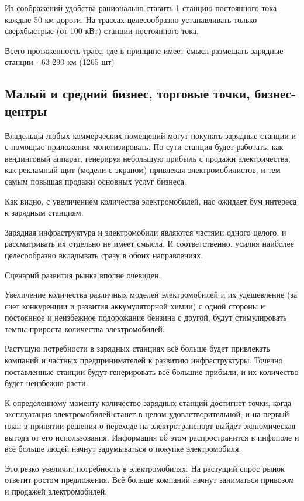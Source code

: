 \documentclass[a4paper,12pt]{report}
\begin{document}
Из соображений удобства рационально ставить 1 станцию постоянного тока каждые 50 км дороги. На трассах целесообразно устанавливать только сверхбыстрые (от 100 кВт) станции постоянного тока. 

Всего протяженность трасс, где в принципе имеет смысл размещать зарядные станции  - 63 290 км (1265 шт)

\subsection{Малый и средний бизнес, торговые точки, бизнес-центры}

Владельцы любых коммерческих помещений могут покупать зарядные станции и с помощью приложения монетизировать. По сути станция будет работать, как вендинговый аппарат, генерируя небольшую прибыль с продажи электричества, как рекламный щит (модели с экраном) привлекая электромобилистов, и тем самым повышая продажи основных услуг бизнеса. 

Как видно, с увеличением количества электромобилей, нас ожидает бум интереса к зарядным станциям. 

Зарядная инфраструктура и электромобили являются частями одного целого, и рассматривать их отдельно не имеет смысла. И соответственно, усилия наиболее целесообразно вкладывать сразу в обоих направлениях.  

Сценарий развития рынка вполне очевиден. 

Увеличение количества различных моделей электромобилей и их удешевление (за счет конкуренции и развития аккумуляторной химии) с одной стороны и постоянное и неизбежное подорожание бензина с другой, будут стимулировать темпы прироста количества электромобилей. 

Растущую потребности в зарядных станциях всё больше будет привлекать компаний и частных предпринимателей к развитию инфраструктуры. Точечно поставленные станции будут генерировать всё большие прибыли, и их количество будет неизбежно расти. 

К определенному моменту количество зарядных станций достигнет точки, когда эксплуатация электромобилей станет в целом удовлетворительной, и на первый план в принятии решения о переходе на электротранспорт выйдет экономическая выгода от его использования. Информация об этом распространится в инфополе и всё больше людей начнут задумываться о покупке электромобиля.

Это резко увеличит потребность в электромобилях. На растущий спрос рынок ответит ростом предложения. Всё больше компаний начнут заниматься привозом и продажей электромобилей. 
\end{document}
